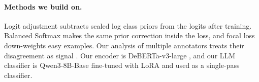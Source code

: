 \paragraph{Methods we build on.}
Logit adjustment \citep{menon2021longtail} subtracts scaled log class priors from the logits after training.
Balanced Softmax \citep{ren2020balanced} makes the same prior correction inside the loss, and focal loss \citep{lin2017focal} down-weights easy examples.
Our analysis of multiple annotators treats their disagreement as signal \citep{uma2021learning}.
Our encoder is DeBERTa-v3-large \citep{he2023debertav3}, and our LLM classifier is Qwen3-8B-Base \citep{qwen3} fine-tuned with LoRA \citep{hu2022lora} and used as a single-pass classifier.
